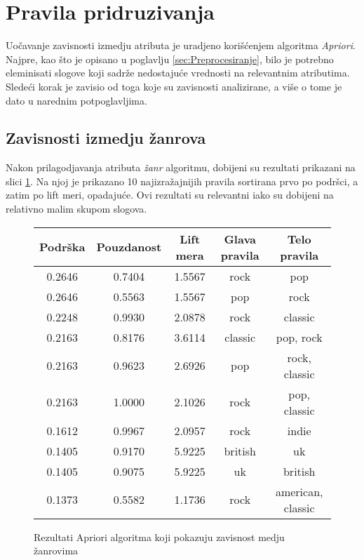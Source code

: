 \section{Pravila pridruzivanja}
\label{sec:PravilaPridruzivanja}

Uo\v{c}avanje zavisnosti izmedju atributa je uradjeno kori\v{s}\'c{}enjem algoritma \emph{Apriori}. Najpre, kao \v{s}to je opisano u poglavlju \ref{sec:Preprocesiranje}, bilo je potrebno eleminisati slogove koji sadr\v{z}e nedostaju\'c{}e vrednosti na relevantnim atributima. Slede\'c{}i korak je zavisio od toga koje su zavisnosti analizirane, a vi\v{s}e o tome je dato u narednim potpoglavljima.


\subsection{Zavisnosti izmedju \v{z}anrova}
\label{subsec:AprioriZavisnostZanrova}

Nakon prilagodjavanja atributa \emph{\v{z}anr} algoritmu, dobijeni su rezultati prikazani na slici \ref{fig:aprioriZanrovi}. Na njoj je prikazano 10 najizra\v{z}ajnijih pravila sortirana prvo po podr\v{s}ci, a zatim po lift meri, opadaju\'c{}e.
Ovi rezultati su relevantni iako su dobijeni na relativno malim skupom slogova.

\begin{figure}[H]
    \footnotesize
    \centering
    \begin{tabular}{|c|c|c|c|c|}
        \hline
        Podr\v{s}ka & Pouzdanost & Lift mera & Glava pravila & Telo pravila \\
        \hline
        0.2646 & 0.7404 & 1.5567 & rock & pop \\
        0.2646 & 0.5563 & 1.5567 & pop & rock \\
        0.2248 & 0.9930 & 2.0878 & rock & classic \\
        0.2163 & 0.8176 & 3.6114 & classic & pop, rock \\
        0.2163 & 0.9623 & 2.6926 & pop & rock, classic \\
        0.2163 & 1.0000 & 2.1026 & rock & pop, classic \\
        0.1612 & 0.9967 & 2.0957 & rock & indie \\
        0.1405 & 0.9170 & 5.9225 & british & uk \\
        0.1405 & 0.9075 & 5.9225 & uk & british \\
        0.1373 & 0.5582 & 1.1736 & rock & american, classic \\
        \hline
    \end{tabular}
    \caption{Rezultati Apriori algoritma koji pokazuju zavisnost medju \v{z}anrovima}
    \label{fig:aprioriZanrovi}
\end{figure}


